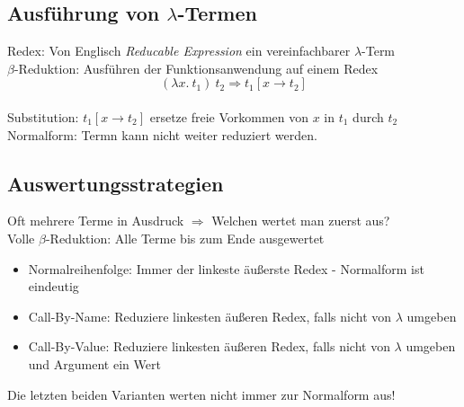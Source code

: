 \subsection{Ausführung von \(\lambda\)-Termen}
Redex: Von Englisch \textit{Reducable Expression} ein vereinfachbarer \(\lambda\)-Term\\
\(\beta\)-Reduktion: Ausführen der Funktionsanwendung auf einem Redex \[(\lambda x.\ t_1)\ t_2 \Rightarrow t_1 [x \rightarrow t_2]\]\\
Substitution: \(t_1 [x \rightarrow t_2]\) ersetze freie Vorkommen von \(x\) in \(t_1\) durch \(t_2\)\\
Normalform: Termn kann nicht weiter reduziert werden.

\subsection{Auswertungsstrategien}
Oft mehrere Terme in Ausdruck \(\Rightarrow\) Welchen wertet man zuerst aus?\\
Volle \(\beta\)-Reduktion: Alle Terme bis zum Ende ausgewertet
\begin{itemize}
  \item Normalreihenfolge: Immer der linkeste äußerste Redex - Normalform ist eindeutig
  \item Call-By-Name: Reduziere linkesten äußeren Redex, falls nicht von \(\lambda\) umgeben
  \item Call-By-Value: Reduziere linkesten äußeren Redex, falls nicht von \(\lambda\) umgeben und Argument ein Wert
\end{itemize}
Die letzten beiden Varianten werten nicht immer zur Normalform aus!

